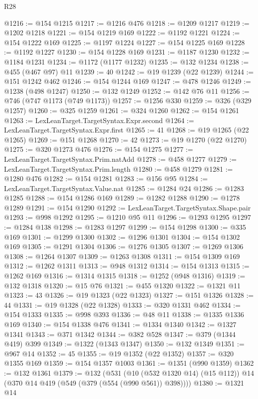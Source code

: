 \begin{lexlean}{R28}
\begin{coremodule}
@1216 := @154 @1215
@1217 := @1216 @476
@1218 := @1209 @1217
@1219 := @1202 @1218
@1221 := @154 @1219 @169
@1222 := @1192 @1221
@1224 := @154 @1222 @169
@1225 := @1197 @1224
@1227 := @154 @1225 @169
@1228 := @1192 @1227
@1230 := @154 @1228 @169
@1231 := @1187 @1230
@1232 := @1184 @1231
@1234 := @1172 (@1177 @1232)
@1235 := @132 @1234
@1238 := @455 (@467 @97) @11
@1239 := 40
@1242 := @19 @1239 (@22 @1239)
@1244 := @151 @1242 @462
@1246 := @154 @1244 @169
@1247 := @478 @1246
@1249 := @1238 (@498 @1247)
@1250 := @132 @1249
@1252 := @142 @76 @11
@1256 := @746 (@747 @1173 (@749 @1173))
@1257 := @1256 @330
@1259 := @326 (@329 @1257)
@1260 := @325 @1259
@1261 := @324 @1260
@1262 := @154 @1261
@1263 := LexLeanTarget.TargetSyntax.Expr.second
@1264 := LexLeanTarget.TargetSyntax.Expr.first
@1265 := 41
@1268 := @19 @1265 (@22 @1265)
@1269 := @151 @1268
@1270 := 42
@1273 := @19 @1270 (@22 @1270)
@1275 := @320 @1273 @476
@1276 := @154 @1275
@1277 := LexLeanTarget.TargetSyntax.Prim.natAdd
@1278 := @458 @1277
@1279 := LexLeanTarget.TargetSyntax.Prim.length
@1280 := @458 @1279
@1281 := @1280 @476
@1282 := @154 @1281
@1283 := @156 @95
@1284 := LexLeanTarget.TargetSyntax.Value.nat
@1285 := @1284 @24
@1286 := @1283 @1285
@1288 := @154 @1286 @169
@1289 := @1282 @1288
@1290 := @1278 @1289
@1291 := @154 @1290
@1292 := LexLeanTarget.TargetSyntax.Shape.pair
@1293 := @998 @1292
@1295 := @1210 @95 @11
@1296 := @1293 @1295
@1297 := @1284 @138
@1298 := @1283 @1297
@1299 := @154 @1298
@1300 := @335 @169
@1301 := @1299 @1300
@1302 := @1296 @1301
@1304 := @154 @1302 @169
@1305 := @1291 @1304
@1306 := @1276 @1305
@1307 := @1269 @1306
@1308 := @1264 @1307
@1309 := @1263 @1308
@1311 := @154 @1309 @169
@1312 := @1262 @1311
@1313 := @948 @1312
@1314 := @154 @1313
@1315 := @1262 @169
@1316 := @1314 @1315
@1318 := @1252 (@948 @1316)
@1319 := @132 @1318
@1320 := @15 @76
@1321 := @455 @1320
@1322 := @1321 @11
@1323 := 43
@1326 := @19 @1323 (@22 @1323)
@1327 := @151 @1326
@1328 := 44
@1331 := @19 @1328 (@22 @1328)
@1333 := @320 @1331 @462
@1334 := @154 @1333
@1335 := @998 @393
@1336 := @48 @11
@1338 := @1335 @1336 @169
@1340 := @154 @1338 @476
@1341 := @1334 @1340
@1342 := @1327 @1341
@1343 := @371 @1342
@1344 := @382 @528
@1347 := @379 (@1344 @419) @399
@1349 := @1322 (@1343 @1347)
@1350 := @132 @1349
@1351 := @967 @14
@1352 := 45
@1355 := @19 @1352 (@22 @1352)
@1357 := @320 @1355 @169
@1359 := @154 @1357 @1003
@1361 := @1351 (@990 @1359)
@1362 := @132 @1361
@1379 := @132
    (@531
      (@10 (@532 @1320 @14) (@15 @112))
      @14
      (@370 @14 @419 (@549 (@379 (@554 (@990 @561)) @398))))
@1380 := @1321 @14

\end{coremodule}
\end{lexlean}
